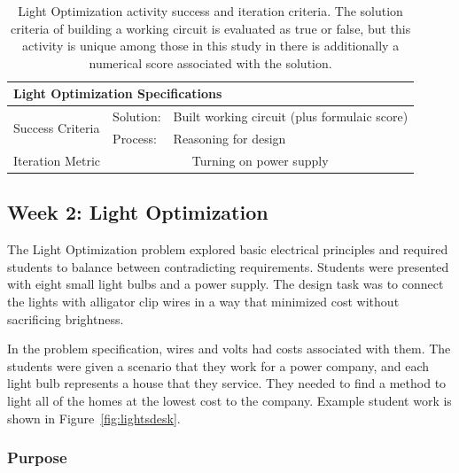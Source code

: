 \begin{table}
	\begin{centering}
	\begin{tabular}{l  l   l}
		\multicolumn{3}{l}{{\large Light Optimization Specifications}} \\
		\toprule
		\multirow{2}{*}{Success Criteria}  
			& Solution: 		& Built working circuit (plus formulaic score) \\ \cmidrule(r){2-3}
			& Process:		& Reasoning for design \\ \midrule
		Iteration Metric	 & \multicolumn{2}{c}{Turning on power supply }\\ 
		\bottomrule
	\end{tabular}
	\caption[Light Optimization activity success and iteration criteria.]{Light Optimization activity success and iteration criteria. The solution criteria of building a working circuit is evaluated as true or false, but this activity is unique among those in this study in there is additionally a numerical score associated with the solution.}
	\label{tab:spec-lights}
	\end{centering}
	\end{table}
\subsection{Week 2: Light Optimization}
	
	The Light Optimization problem explored basic electrical principles and required students to balance between contradicting requirements. Students were presented with eight small light bulbs and a power supply. The design task was to connect the lights with alligator clip wires in a way that minimized cost without sacrificing brightness. 
	
	In the problem specification, wires and volts had costs associated with them.  The students were given a scenario that they work for a power company, and each light bulb represents a house that they service. They needed to
	find a method to light all of the homes at the lowest cost to the company. Example student work is shown in Figure~\ref{fig:lightsdesk}.

	
	\subsubsection{Purpose}
	
